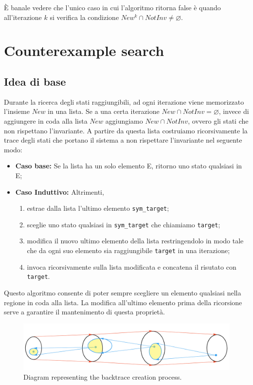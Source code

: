 \documentclass[12pt]{article}
\begin{document}
    È banale vedere che l'unico caso in cui l'algoritmo ritorna false è quando all'iterazione $k$ si verifica la condizione $New^k \cap NotInv \neq \varnothing$.
    
    \section{Counterexample search}
    \subsection{Idea di base}
    Durante la ricerca degli stati raggiungibili, ad ogni iterazione viene memorizzato l'insieme $New$ in una lista.
    Se a una certa iterazione $New \cap NotInv = \varnothing$, invece di aggiungere in coda alla lista $New$ aggiungiamo $New \cap NotInv$, ovvero gli stati che non rispettano l'invariante.
    A partire da questa lista costruiamo ricorsivamente la trace degli stati che portano il sistema a non rispettare l'invariante nel seguente modo:
    \begin{itemize}
        \item \textbf{Caso base:} Se la lista ha un solo elemento E, ritorno uno stato qualsiasi in E;
        \item \textbf{Caso Induttivo:} Altrimenti, 
        \begin{enumerate}
            \item estrae dalla lista l'ultimo elemento \texttt{sym\_target};
            \item sceglie uno stato qualsiasi in \texttt{sym\_target} che chiamiamo \texttt{target};
            \item modifica il nuovo ultimo elemento della lista restringendolo in modo tale che da ogni suo elemento sia raggiungibile \texttt{target} in una iterazione;
            \item invoca ricorsivamente sulla lista modificata e concatena il risutato con \texttt{target}.
        \end{enumerate}
    \end{itemize}

    Questo algoritmo consente di poter sempre scegliere un elemento qualsiasi nella regione in coda alla lista.
    La modifica all'ultimo elemento prima della ricorsione serve a garantire il mantenimento di questa proprietà.

    \begin{figure}[H] 
        \centering
        \includegraphics[width=\textwidth]{backtrace-diagram.png}
        \caption{Diagram representing the backtrace creation process.}
    \end{figure}
\end{document}
